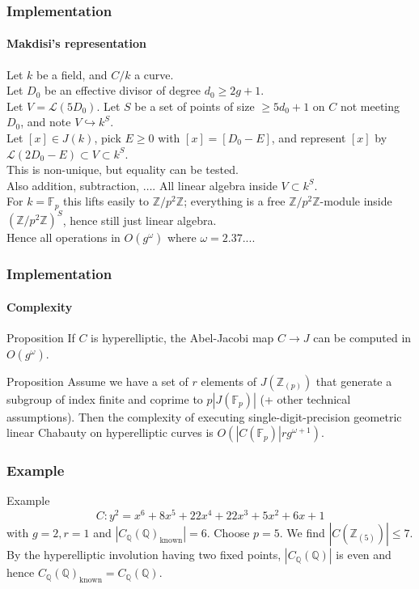 \documentclass[15pt]{beamer}
\newcommand{\Z}{\mathbb{Z}}
\newcommand{\Q}{\mathbb{Q}}
\newcommand{\Lcal}{\mathcal{L}}
\newcommand{\F}{\mathbb{F}}
\begin{document}
\begin{frame}
    \frametitle{Implementation}
    \framesubtitle{Makdisi's representation}
    Let $k$ be a field, and $C/k$ a curve.\\\pause
    Let $D_0$ be an effective divisor of degree $d_0 \geq 2g+1$.\\\pause
    Let $V = \Lcal(5D_0)$. Let $S$ be a set of points of size $\geq 5d_0 + 1$ on $C$ not meeting $D_0$, and note $V \hookrightarrow k^S$. \\\pause
    Let $[x] \in J(k)$, pick $E\geq 0$ with $[x] = [D_0 - E]$, and represent $[x]$ by $\Lcal(2D_0 - E) \subset V \subset k^S$.\\\pause
    This is non-unique, but equality can be tested. \\\pause
    Also addition, subtraction, $\dots$. All linear algebra inside $V \subset k^S$.\\\pause
    For $k = \F_p$ this lifts easily to $\Z/p^2\Z$; everything is a free $\Z/p^2\Z$-module inside $(\Z/p^2\Z)^S$, hence still just linear algebra.\\\pause
    Hence all operations in $O(g^\omega) $ where $\omega = 2.37...$.
\end{frame}

\begin{frame}    
    \frametitle{Implementation}
    \framesubtitle{Complexity}
    \begin{block}{Proposition}
        If $C$ is hyperelliptic, the Abel-Jacobi map $C \to J$ can be computed in $O(g^\omega)$.
    \end{block}\pause
    
    \begin{block}{Proposition}
    	Assume we have a set of $r$ elements of $J(\Z_{(p)})$ that generate a subgroup of index finite and coprime to $p|J(\F_p)|$ (+ other technical assumptions). Then the complexity of executing single-digit-precision geometric linear Chabauty on hyperelliptic curves is $O(|C(\F_p)|rg^{\omega+1})$.
    \end{block}\pause
\end{frame}

\begin{frame}
    \frametitle{Example}
    \begin{block}{Example}
        \[C\colon y^2 = x^6 + 8x^5 + 22x^4 + 22x^3 + 5x^2 + 6x + 1\]
        with $g = 2, r = 1$ and $|C_\Q(\Q)_{\text{known}}| = 6$. Choose $p = 5$. We find $|C(\Z_{(5)})| \leq 7$. By the hyperelliptic involution having two fixed points, $|C_\Q(\Q)|$ is even and hence $C_\Q(\Q)_{\text{known}} = C_\Q(\Q)$.
    \end{block}
\end{frame}
\end{document}

